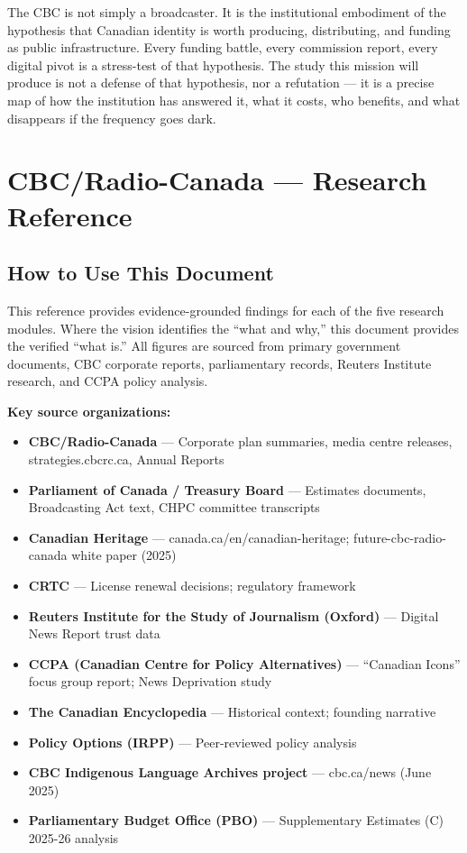 \documentclass[11pt,letterpaper]{article}
\newcommand{\stageheader}[2]{%
  \noindent\colorbox{#2}{\makebox[\textwidth][l]{%
    \textcolor{white}{\bfseries\sffamily\hspace{6pt}#1\hspace{6pt}}}}%
  \vspace{0.5em}\par%
}
\begin{document}
The CBC is not simply a broadcaster. It is the institutional embodiment of the hypothesis that Canadian identity is worth producing, distributing, and funding as public infrastructure. Every funding battle, every commission report, every digital pivot is a stress-test of that hypothesis. The study this mission will produce is not a defense of that hypothesis, nor a refutation --- it is a precise map of how the institution has answered it, what it costs, who benefits, and what disappears if the frequency goes dark.

\newpage

\stageheader{STAGE 2 --- RESEARCH REFERENCE}{secondary}

\section{CBC/Radio-Canada --- Research Reference}

\subsection{How to Use This Document}

This reference provides evidence-grounded findings for each of the five research modules. Where the vision identifies the ``what and why,'' this document provides the verified ``what is.'' All figures are sourced from primary government documents, CBC corporate reports, parliamentary records, Reuters Institute research, and CCPA policy analysis.

\textbf{Key source organizations:}
\begin{itemize}[noitemsep]
\item \textbf{CBC/Radio-Canada} --- Corporate plan summaries, media centre releases, strategies.cbcrc.ca, Annual Reports
\item \textbf{Parliament of Canada / Treasury Board} --- Estimates documents, Broadcasting Act text, CHPC committee transcripts
\item \textbf{Canadian Heritage} --- canada.ca/en/canadian-heritage; future-cbc-radio-canada white paper (2025)
\item \textbf{CRTC} --- License renewal decisions; regulatory framework
\item \textbf{Reuters Institute for the Study of Journalism (Oxford)} --- Digital News Report trust data
\item \textbf{CCPA (Canadian Centre for Policy Alternatives)} --- ``Canadian Icons'' focus group report; News Deprivation study
\item \textbf{The Canadian Encyclopedia} --- Historical context; founding narrative
\item \textbf{Policy Options (IRPP)} --- Peer-reviewed policy analysis
\item \textbf{CBC Indigenous Language Archives project} --- cbc.ca/news (June 2025)
\item \textbf{Parliamentary Budget Office (PBO)} --- Supplementary Estimates (C) 2025-26 analysis
\end{itemize}
\end{document}

